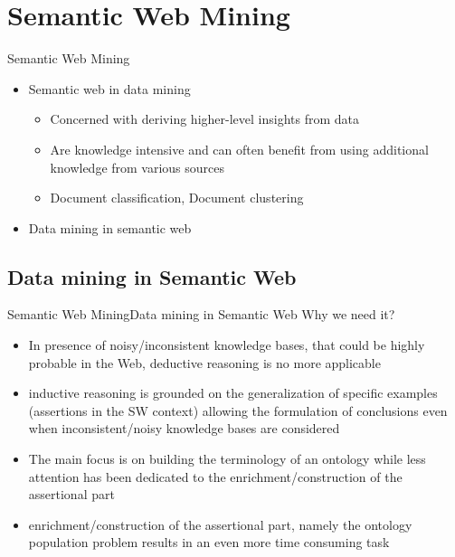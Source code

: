 \documentclass[10pt]{beamer}
\begin{document}
\section{Semantic Web Mining}

\begin{frame}{Semantic Web Mining}
\begin{itemize}
	\item Semantic web in data mining \cite{ristoski2016semantic}
	\begin{itemize}
		\item Concerned with deriving higher-level insights from data
		\item Are knowledge intensive and can often benefit from using additional knowledge from various sources
		\item Document classification, Document clustering \cite{berendt2004roadmap}
	\end{itemize}
	\item Data mining in semantic web \cite{d2010inductive}

\end{itemize}
\end{frame}

\subsection{Data mining in Semantic Web}
\begin{frame}{Semantic Web Mining}{Data mining in Semantic Web}
	Why we need it? \cite{d2010inductive}
	 \begin{itemize} 
		\item In presence of noisy/inconsistent knowledge bases, that could be highly probable in  the Web, deductive reasoning is no more applicable 
		\item inductive reasoning is grounded on the generalization of specific examples (assertions in the SW context) allowing the formulation of conclusions even when inconsistent/noisy knowledge bases are considered
		\item The main focus is on   building the terminology of an ontology while less attention has been dedicated to the enrichment/construction of the assertional part
		\item enrichment/construction of the assertional part, namely the ontology population problem results in an even more time consuming task
	 \end{itemize}
\end{frame}
\end{document}

